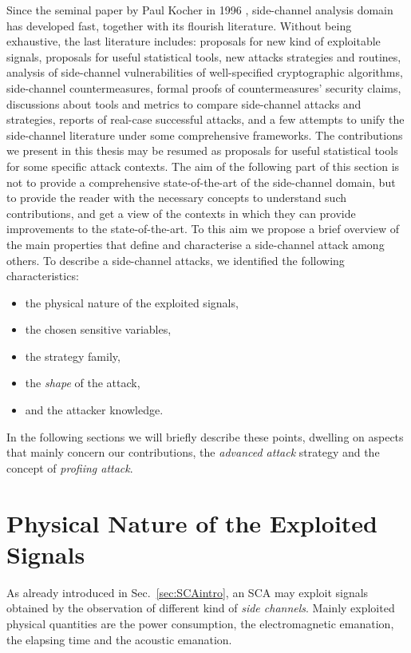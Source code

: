 Since the seminal paper by Paul Kocher in 1996 \cite{kocher1996timing}, side-channel analysis domain has developed fast, together with its flourish literature. Without being exhaustive, the last literature includes: proposals for new kind of exploitable signals, proposals for useful statistical tools, new attacks strategies and routines, analysis of side-channel vulnerabilities of well-specified cryptographic algorithms, side-channel countermeasures, formal proofs of countermeasures' security claims, discussions about tools and metrics to compare side-channel attacks and strategies, reports of real-case successful attacks, and a few attempts to unify the side-channel literature under some comprehensive frameworks. The contributions we present in this thesis may be resumed as proposals for useful statistical tools for some specific attack contexts. The aim of the following part of this section is not to provide a comprehensive state-of-the-art of the side-channel domain, but to provide the reader with the necessary concepts to understand such contributions, and get a view of the contexts in which they can provide improvements to the state-of-the-art. To this aim we propose a brief overview of the main properties that define and characterise a side-channel attack among others. To describe a side-channel attacks, we identified  the following characteristics: 
\begin{itemize}
\item the physical nature of the exploited signals,
\item the chosen sensitive variables,
\item the strategy family,
\item the \emph{shape} of the attack,
\item and the attacker knowledge.
\end{itemize} 

In the following sections we will briefly describe these points, dwelling on aspects that  mainly concern our contributions, \ie the \emph{advanced attack} strategy and the concept of \emph{profiing attack}. 

\section{Physical Nature of the Exploited Signals}\label{sec:physical_signals}
As already introduced in Sec.~\ref{sec:SCAintro}, an SCA may exploit signals obtained by the observation of different kind of \emph{side channels}. Mainly exploited physical quantities are the power consumption, the electromagnetic emanation, the elapsing time and the acoustic emanation. 

